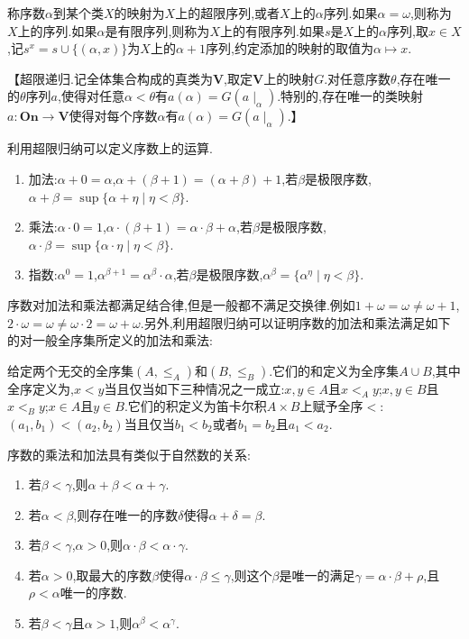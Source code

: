 称序数$\alpha$到某个类$X$的映射为$X$上的超限序列,或者$X$上的$\alpha$序列.如果$\alpha=\omega$,则称为$X$上的序列.如果$\alpha$是有限序列,则称为$X$上的有限序列.如果$s$是$X$上的$\alpha$序列,取$x\in X$,记$s^x=s\cup\{(\alpha,x)\}$为$X$上的$\alpha+1$序列,约定添加的映射的取值为$\alpha\mapsto x$.

【超限递归.记全体集合构成的真类为$\textbf{V}$,取定$\textbf{V}$上的映射$G$.对任意序数$\theta$,存在唯一的$\theta$序列$a$,使得对任意$\alpha<\theta$有$a(\alpha)=G(a\mid_{\alpha})$.特别的,存在唯一的类映射$a:\textbf{On}\to\textbf{V}$使得对每个序数$\alpha$有$a(\alpha)=G(a\mid_{\alpha})$.】

利用超限归纳可以定义序数上的运算.
\begin{enumerate}
	\item 加法:$\alpha+0=\alpha$,$\alpha+(\beta+1)=(\alpha+\beta)+1$,若$\beta$是极限序数,$\alpha+\beta=\sup\{\alpha+\eta\mid\eta<\beta\}$.
	\item 乘法:$\alpha\cdot 0=1$,$\alpha\cdot(\beta+1)=\alpha\cdot\beta+\alpha$,若$\beta$是极限序数,$\alpha\cdot\beta=\sup\{\alpha\cdot\eta\mid\eta<\beta\}$.
	\item 指数:$\alpha^0=1$,$\alpha^{\beta+1}=\alpha^{\beta}\cdot\alpha$,若$\beta$是极限序数,$\alpha^{\beta}=\{\alpha^{\eta}\mid\eta<\beta\}$.
\end{enumerate}

序数对加法和乘法都满足结合律,但是一般都不满足交换律.例如$1+\omega=\omega\not=\omega+1$,$2\cdot\omega=\omega\not=\omega\cdot2=\omega+\omega$.另外,利用超限归纳可以证明序数的加法和乘法满足如下的对一般全序集所定义的加法和乘法:

给定两个无交的全序集$(A,\le_A)$和$(B,\le_B)$.它们的和定义为全序集$A\cup B$,其中全序定义为,$x<y$当且仅当如下三种情况之一成立:$x,y\in A$且$x<_A y$;$x,y\in B$且$x<_B y$;$x\in A$且$y\in B$.它们的积定义为笛卡尔积$A\times B$上赋予全序$<$:$(a_1,b_1)<(a_2,b_2)$当且仅当$b_1<b_2$或者$b_1=b_2$且$a_1<a_2$.

序数的乘法和加法具有类似于自然数的关系:
\begin{enumerate}
	\item 若$\beta<\gamma$,则$\alpha+\beta<\alpha+\gamma$.
	\item 若$\alpha<\beta$,则存在唯一的序数$\delta$使得$\alpha+\delta=\beta$.
	\item 若$\beta<\gamma$,$\alpha>0$,则$\alpha\cdot\beta<\alpha\cdot\gamma$.
	\item 若$\alpha>0$,取最大的序数$\beta$使得$\alpha\cdot\beta\le\gamma$,则这个$\beta$是唯一的满足$\gamma=\alpha\cdot\beta+\rho$,且$\rho<\alpha$唯一的序数.
	\item 若$\beta<\gamma$且$\alpha>1$,则$\alpha^{\beta}<\alpha^{\gamma}$.
\end{enumerate}

